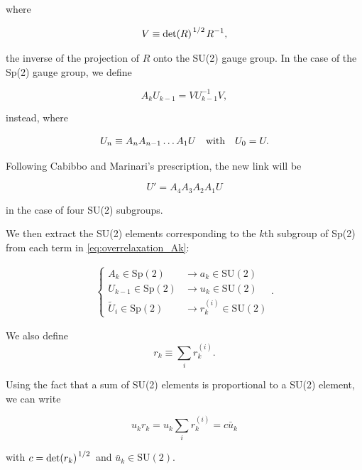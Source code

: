 \documentclass[reqno,12pt]{article}
\numberwithin{equation}{section}
\newcommand{\SU}{\mathrm{SU}}
\newcommand{\Sp}{\mathrm{Sp}}
\begin{document}
where 

\begin{equation}
	V \equiv \det(R)^{\flatfrac{1}{2}} R^{-1},
\end{equation}

the inverse of the projection of $R$ onto the SU(2) gauge group. In the case of the Sp(2) gauge group, 
we define 

\begin{equation} \label{eq:overrelaxation_Ak}
	A_k U_{k-1} = V U_{k-1}^{-1} V,
\end{equation}

instead, where 

\begin{equation}
	U_{n} \equiv A_n A_{n-1} \dots A_1 U \qq{with} U_0 = U.
\end{equation}

Following Cabibbo and Marinari's prescription, the new link will be

\begin{equation} \label{eq:overrelaxation_newlink}
	U' = A_4 A_3 A_2 A_1 U
\end{equation}

in the case of four SU(2) subgroups.

We then extract the SU(2) elements corresponding to the $k$th subgroup of Sp(2) 
from each term in \eqref{eq:overrelaxation_Ak}:

\begin{eqnarray}
	\begin{cases}
		A_k \in \Sp(2) &\longrightarrow a_k \in \SU(2) \\
		U_{k-1} \in \Sp(2) &\longrightarrow u_k \in \SU(2) \\
		\widetilde{U}_i \in \Sp(2) &\longrightarrow r_k^{(i)} \in \SU(2)
	\end{cases}.
\end{eqnarray}

We also define
\begin{equation}
	r_k \equiv \sum_i r_k^{(i)}.
\end{equation}

Using the fact that a sum of SU(2) elements is proportional to a SU(2) element, we can write

\begin{equation}
	u_k r_k = u_k \sum_i r_k^{(i)} = c \bar{u}_k
\end{equation}

with $c = \det(r_k)^{\flatfrac{1}{2}}$ and $\bar{u}_k \in \SU(2)$.
\end{document}
